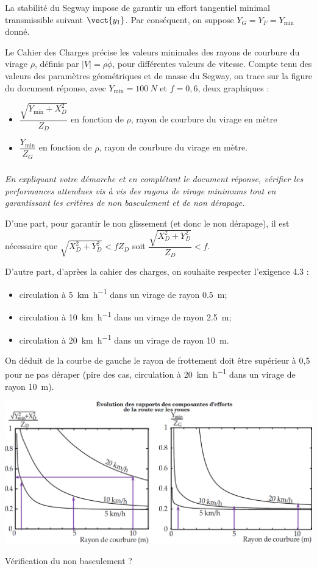 \documentclass[10pt,fleqn]{article} %
\begin{document}
\ifprof
\else


La stabilité du Segway impose de garantir un effort tangentiel minimal transmissible suivant $\vect{y_1}$. Par conséquent, on suppose  $Y_G = Y_F=Y_{\text{min}}$ donné. 

Le Cahier des Charges précise les valeurs minimales des rayons de courbure du virage $\rho$, définis par $|V|=\rho\dot{\phi}$, pour différentes valeurs de vitesse. Compte tenu des valeurs des paramètres géométriques et de masse du Segway, on trace sur la figure du document réponse, avec $Y_{\text{min}}=\SI{100}{N}$ et $f=0,6$, deux graphiques :
\begin{itemize}
\item  $\dfrac{\sqrt{Y_{\text{min}}+X_D^2}}{Z_D}$ en fonction de $\rho$, rayon de courbure du virage en mètre
\item  $\dfrac{Y_{\text{min}}}{Z_G}$ en fonction de $\rho$, rayon de courbure du virage en mètre.
\end{itemize}

\fi


\subparagraph{\label{q_16}}\textit{En expliquant votre démarche et en complétant le document réponse, vérifier les performances attendues vis à vis des rayons de virage minimums tout en garantissant les critères de non basculement et de non dérapage.}
\ifprof
\begin{corrige}
D'une part, pour garantir le non glissement (et donc le non dérapage), il est nécessaire que $\sqrt{X_D^2+Y_D^2} < f Z_D$ soit $\dfrac{\sqrt{X_D^2+Y_D^2}}{Z_D} < f $.

D'autre part, d'aprèes la cahier des charges, on souhaite respecter l'exigence 4.3 :
\begin{itemize} 
\item circulation à  \SI{5}{km.h^{-1}} dans un virage de rayon \SI{0,5}{m};
\item circulation à  \SI{10}{km.h^{-1}} dans un virage de rayon \SI{2,5}{m};
\item circulation à  \SI{20}{km.h^{-1}} dans un virage de rayon \SI{10}{m}.
\end{itemize}
On déduit de la courbe de gauche le rayon de frottement doit être supérieur à 0,5 pour ne pas déraper (pire des cas, circulation à   \SI{20}{km.h^{-1}} dans un virage de rayon \SI{10}{m}).


\begin{center}
\includegraphics[width=.7\linewidth]{cor_06}
\end{center}

Vérification du non basculement ?

\end{corrige}
\else
\fi
\end{document}
